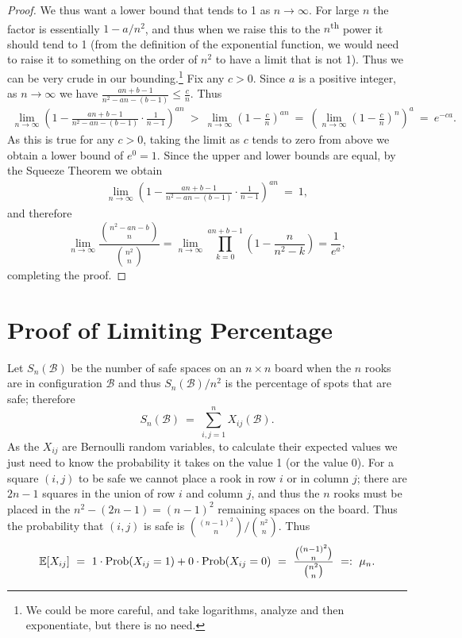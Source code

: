 \documentclass[12pt,reqno]{amsart}
\newcommand{\E}{\mathbb{E}}
\renewcommand{\E}{\mathbb{E}}
\numberwithin{equation}{section}
\theoremstyle{plain}
\newcommand\be{\begin{equation}}
\newcommand\ee{\end{equation}}
\newcommand\bea{\begin{eqnarray}}
\newcommand\eea{\end{eqnarray}}
\newcommand{\ncr}[2]{{#1 \choose #2}}
\begin{document}
\begin{proof}
We thus want a lower bound that tends to 1 as $n\to\infty$. For large $n$ the factor is essentially $1 - a/n^2$, and thus when we raise this to the $n$\textsuperscript{th} power it should tend to 1 (from the definition of the exponential function, we would need to raise it to something on the order of $n^2$ to have a limit that is not 1). Thus we can be very crude in our bounding.\footnote{We could be more careful, and take logarithms, analyze and then exponentiate, but there is no need.} Fix any $c > 0$. Since $a$ is a positive integer, as $n\rightarrow \infty$ we have $\frac{an+b-1}{n^2 - an - (b-1)} \leq \frac{c}{n}$. Thus
\begin{align}
    \lim_{n\rightarrow \infty}\left(1 - \frac{an+b-1}{n^2 - an -
    (b-1)} \cdot \frac{1}{n-1}\right)^{an}\ > \ \lim_{n\rightarrow \infty} \left(1- \frac{c}{n}\right)^{an} \ = \ \left(\lim_{n\to\infty}\left(1 - \frac{c}{n}\right)^n\right)^a \ = \ e^{-ca}.
\end{align}
As this is true for any $c>0$, taking the limit as $c$ tends to zero from above we obtain a lower bound of $e^0 = 1$. Since the upper and lower bounds are equal, by the Squeeze Theorem we obtain
\begin{align}
   \lim_{n\rightarrow \infty}\left(1 - \frac{an+b-1}{n^2 - an -
    (b-1)} \cdot \frac{1}{n-1}\right)^{an}\ =\ 1,
\end{align} and therefore
\be \lim_{n\rightarrow \infty} \frac{\ncr{n^2 - an -b}{n}}{\ncr{n^2}{n}} = \lim_{n\rightarrow \infty}\prod_{k=0}^{an+b-1}\left(1-\frac{n}{n^2 - k}\right) = \frac{1}{e^a}, \ee
completing the proof. \end{proof}


\section{Proof of Limiting Percentage}\label{sec:mainproof}

Let $S_n(\mathcal{B})$ be the number of safe spaces on an $n\times n$ board when the $n$ rooks are in configuration $\mathcal{B}$ and thus $S_n(\mathcal{B})/n^2$ is the percentage of spots that are safe; therefore \be S_n(\mathcal{B}) \ = \ \sum_{i,j=1}^n X_{ij}(\mathcal{B}). \ee As the $X_{ij}$ are Bernoulli random variables, to calculate their expected values we just need to know the probability it takes on the value 1 (or the value 0). For a square $(i,j)$ to be safe we cannot place a rook in row $i$ or in column $j$; there are $2n-1$ squares in the union of row $i$ and column $j$, and thus the $n$ rooks must be placed in the $n^2 - (2n-1) = (n-1)^2$ remaining spaces on the board. Thus the probability that $(i,j)$ is safe is $\ncr{(n-1)^2}{n} / \ncr{n^2}{n}$. Thus
\bea \E[X_{ij}]  \ = \ 1 \cdot {\rm Prob}(X_{ij} = 1) + 0 \cdot {\rm Prob}(X_{ij} = 0) \ = \ \frac{\ncr{(n-1)^2}{n}}{\ncr{n^2}{n}} \ =: \ \mu_n.\eea 
\end{document}
